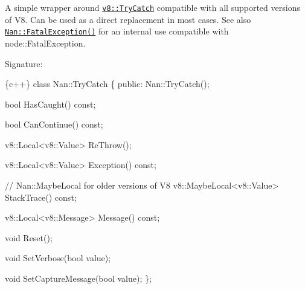 A simple wrapper around \href{https://v8docs.nodesource.com/io.js-3.0/d4/dc6/classv8_1_1_try_catch.html}{\tt {\ttfamily v8\+::\+Try\+Catch}} compatible with all supported versions of V8. Can be used as a direct replacement in most cases. See also \href{#api_nan_fatal_exception}{\tt {\ttfamily Nan\+::\+Fatal\+Exception()}} for an internal use compatible with {\ttfamily node\+::\+Fatal\+Exception}.

Signature\+:


\begin{DoxyCode}
\{c++\}
class Nan::TryCatch \{
 public:
  Nan::TryCatch();

  bool HasCaught() const;

  bool CanContinue() const;

  v8::Local<v8::Value> ReThrow();

  v8::Local<v8::Value> Exception() const;

  // Nan::MaybeLocal for older versions of V8
  v8::MaybeLocal<v8::Value> StackTrace() const;

  v8::Local<v8::Message> Message() const;

  void Reset();

  void SetVerbose(bool value);

  void SetCaptureMessage(bool value);
\};
\end{DoxyCode}
 